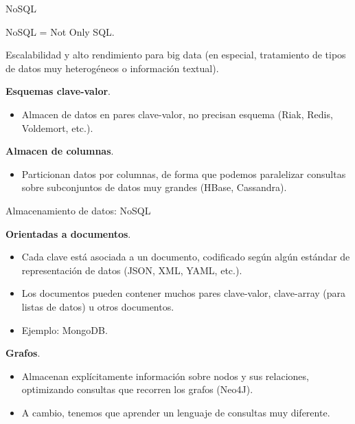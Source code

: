 \begin{frame}{NoSQL}
 \begin{wideitemize}
  \item NoSQL = Not Only SQL.
  \item Escalabilidad y alto rendimiento para big data (en especial, tratamiento
  de tipos de datos muy heterogéneos o información textual).
  \item \textbf{Esquemas clave-valor}.
  \begin{itemize}
   \item Almacen de datos en pares clave-valor, no precisan esquema (Riak, Redis,
   Voldemort, etc.).
  \end{itemize}

  \item \textbf{Almacen de columnas}.
  \begin{itemize}
   \item Particionan datos por columnas, de forma que podemos paralelizar consultas
   sobre subconjuntos de datos muy grandes (HBase, Cassandra).
  \end{itemize}

 \end{wideitemize}

\end{frame}


\begin{frame}{Almacenamiento de datos: NoSQL}
 \begin{wideitemize}
  \item \textbf{Orientadas a documentos}.
  \begin{itemize}
   \item Cada clave está asociada a un documento, codificado según algún estándar
   de representación de datos (JSON, XML, YAML, etc.). 
   \item Los documentos pueden contener
   muchos pares clave-valor, clave-array (para listas de datos) u otros documentos.
   \item Ejemplo: MongoDB.
  \end{itemize}

  \item \textbf{Grafos}.
  \begin{itemize}
   \item Almacenan explícitamente información sobre nodos y sus relaciones, optimizando
   consultas que recorren los grafos (Neo4J).
   
   \item A cambio, tenemos que aprender un lenguaje de consultas muy diferente.
  \end{itemize}

 \end{wideitemize}

\end{frame}

